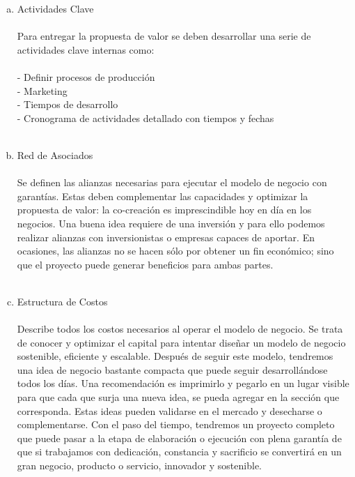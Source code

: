 \begin{enumerate}[1.]
\begin{enumerate}[a)]
			\\
			\item Actividades Clave \\
			\\
			Para entregar la propuesta de valor se deben desarrollar una serie de actividades clave internas como:\\
			\\
			- Definir procesos de producción\\
			- Marketing\\
			- Tiempos de desarrollo\\
			- Cronograma de actividades detallado con tiempos y fechas\\
			\\
			\item Red de Asociados\\
			\\
			Se definen las alianzas necesarias para ejecutar el modelo de negocio con garantías. Estas deben complementar las capacidades y optimizar la propuesta de valor: la co-creación es imprescindible hoy en día en los negocios. Una buena idea requiere de una inversión y para ello podemos realizar alianzas con inversionistas o empresas capaces de aportar. En ocasiones, las alianzas no se hacen sólo por obtener un fin económico; sino que el proyecto puede generar beneficios para ambas partes.\\
			\\			
			\item Estructura de Costos\\
			\\
			Describe todos los costos necesarios al operar el modelo de negocio. Se trata de conocer y optimizar el capital para intentar diseñar un modelo de negocio sostenible, eficiente y escalable. Después de seguir este modelo, tendremos una idea de negocio bastante compacta que puede seguir desarrollándose todos los días. Una recomendación es imprimirlo y pegarlo en un lugar visible para que cada que surja una nueva idea, se pueda agregar en la sección que corresponda. Estas ideas pueden validarse en el mercado y desecharse o complementarse. Con el paso del tiempo, tendremos un proyecto completo que puede pasar a la etapa de elaboración o ejecución con plena garantía de que si trabajamos con dedicación, constancia y sacrificio se convertirá en un gran negocio, producto o servicio, innovador y sostenible.\\


\end{enumerate}
\end{enumerate}
